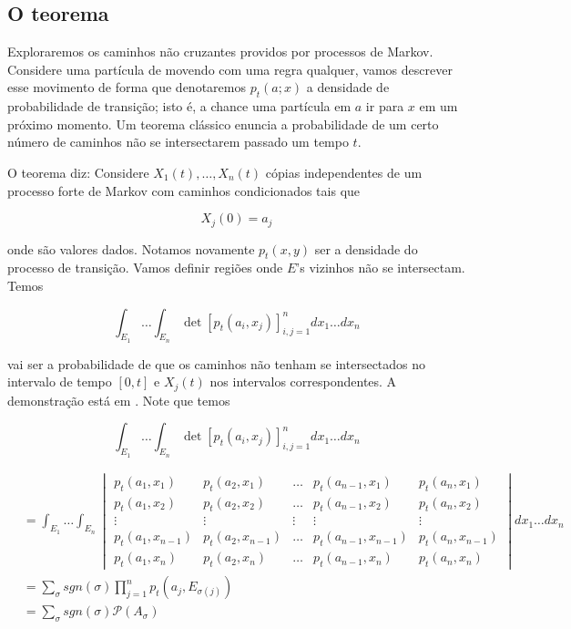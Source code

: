 \subsection{O teorema}

Exploraremos os caminhos não cruzantes providos por processos de Markov. Considere uma partícula de movendo com uma regra qualquer, vamos descrever esse movimento de forma que denotaremos $p_t(a;x)$ a densidade de probabilidade de transição; isto é, a chance uma partícula em $a$ ir para $x$ em um próximo momento. Um teorema clássico enuncia a probabilidade de um certo número de caminhos não se intersectarem passado um tempo $t$.

O teorema diz: Considere $X_1(t), \dots, X_n(t)$ cópias independentes de um processo forte de Markov com caminhos condicionados tais que

\[
	X_j(0) = a_j
\] 

onde  são valores dados. Notamos novamente $p_t(x, y)$ ser a densidade do processo de transição. Vamos definir regiões  onde $E$'s vizinhos não se intersectam. Temos

\[
	\int_{E_1} \dots \int_{E_n} \det{[p_t(a_i, x_j)]^{n}_{i,j=1}} dx_1 \dots dx_n
\]

vai ser a probabilidade de que os caminhos não tenham se intersectados no intervalo de tempo $[0, t]$ e $X_j(t)$ nos intervalos correspondentes. A demonstração está em \cite{ArnoLectureNotes}. Note que temos

\[
\int_{E_1} \dots \int_{E_n} \det{[p_t(a_i, x_j)]^{n}_{i,j=1}}  dx_1 \dots dx_n
\]

\begin{align}
	& = \int_{E_1} \dots \int_{E_n}
	\begin{vmatrix}
		p_t(a_1, x_1) 	& p_t(a_2, x_1) 	 & \dots	& p_t(a_{n-1}, x_1) 	& p_t(a_n, x_1) \\
		p_t(a_1, x_2) 	& p_t(a_2, x_2) 	 & \dots 	&  p_t(a_{n-1}, x_2)				&  p_t(a_n, x_2) \\
		\vdots 			& \vdots 			 & \vdots 	& \vdots 				& \vdots \\
		p_t(a_1, x_{n-1}) & p_t(a_2, x_{n-1})& \dots 	&  	p_t(a_{n-1}, x_{n-1})	& p_t(a_n, x_{n-1}) \\
		p_t(a_1, x_n) 	& p_t(a_2, x_n) 	 & \dots  	& p_t(a_{n-1}, x_n) 	& p_t(a_n, x_n)
	\end{vmatrix} dx_1 \dots dx_n \\ 
	& = \sum_{\sigma}sgn(\sigma) \prod_{j=1}^{n} p_t(a_j, E_{\sigma(j)}) \\
	& = \sum_{\sigma} sgn(\sigma) \mathcal{P}(A_\sigma)
	\label{eq: detInd}
\end{align}

